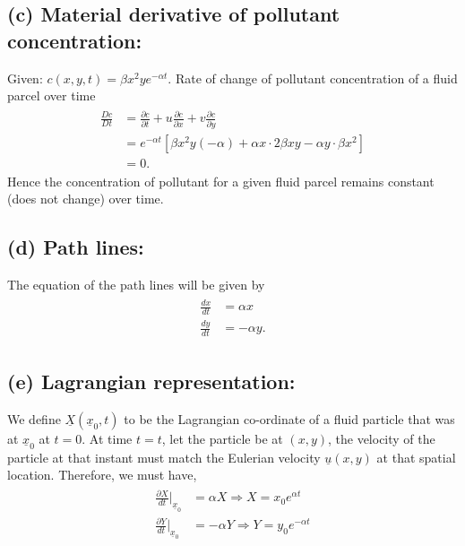 \documentclass{article}
\begin{document}
\subsection*{(c) Material derivative of pollutant concentration:}
Given: $c(x, y, t) = \beta x^{2}y e^{-\alpha t}$. Rate of change of pollutant concentration of a fluid parcel over time 
\begin{align}\label{eq:pollutant_concentration}
 \begin{split}
  \frac{Dc}{Dt} & = \frac{\partial c}{\partial t} + u \frac{\partial c}{\partial x} + v \frac{\partial c}{\partial y} \\
  &= e^{-\alpha t}\left[\beta x^{2}y(-\alpha) + \alpha x \cdot 2 \beta x y - \alpha y \cdot \beta x^{2}\right]\\
  & = 0.
  \end{split}
\end{align}
Hence the concentration of pollutant for a given fluid parcel remains constant (does not change) over time. 
\subsection*{(d) Path lines:}
The equation of the path lines will be given by
\begin{align}\label{eq:pathlines}
 \begin{split}
  \frac{dx}{dt} &= \alpha x \\
  \frac{dy}{dt} &= -\alpha y.
 \end{split}
\end{align}
\subsection*{(e) Lagrangian representation:}
We define $\underline{X}(\underline{x}_{0}, t)$ to be the Lagrangian co-ordinate of a fluid particle that was at $\underline{x}_{0}$ at $t = 0$. At time $t=t$, let the particle be at $(x,y)$, the velocity of the particle at that instant must match the Eulerian velocity $\underline{u}(x, y)$ at that spatial location. Therefore, we must have,
\begin{align}\label{eq:lagrangian_coord}
 \begin{split}
  \frac{\partial X}{dt}\bigg|_{\underline{x}_{0}} &= \alpha X \Rightarrow X = x_{0} e^{\alpha t} \\
  \frac{\partial Y}{dt}\bigg|_{\underline{x}_{0}} &= -\alpha Y \Rightarrow Y = y_{0} e^{-\alpha t} \\
  \end{split}
\end{align}
\end{document}
